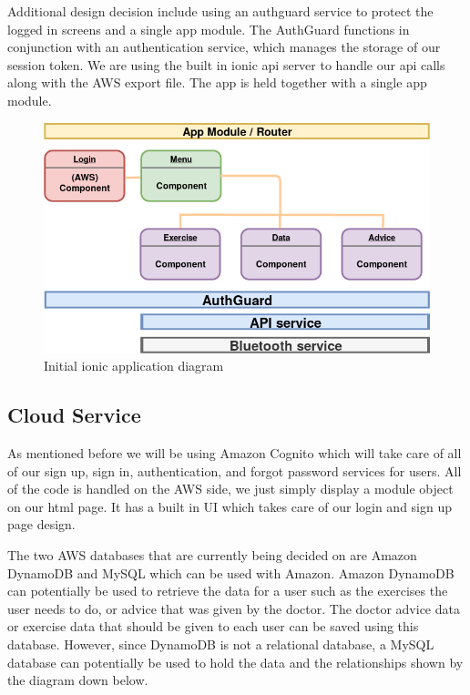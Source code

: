 \documentclass[a4paper,10pt]{article}
\begin{document}
            Additional design decision include using an authguard service to protect the logged in screens and a single app module. The AuthGuard functions in conjunction with an authentication service, which manages the storage of our session token. We are using the built in ionic api server to handle our api calls along with the AWS export file. The app is held together with a single app module.
            
            \begin{figure}[H]
            \centering
            \includegraphics[width=140mm, scale=1]{IonicDiagramFinal}
            \caption{Initial ionic application diagram}
            \end{figure}
        \subsection{Cloud Service}
	As mentioned before we will be using Amazon Cognito which will take care of all of our sign up, sign in, authentication, and forgot password services for users. All of the code is handled on the AWS side, we just simply display a module object on our html page. It has a built in UI which takes care of our login and sign up page design.

	The two AWS databases that are currently being decided on are Amazon DynamoDB and MySQL which can be used with Amazon. Amazon DynamoDB can potentially be used to retrieve the data for a user such as the exercises the user needs to do, or advice that was given by the doctor. The doctor advice data or exercise data that should be given to each user can be saved using this database. However, since DynamoDB is not a relational database, a MySQL database can potentially be used to hold the data and the relationships shown by the diagram down below.
	
\end{document}
